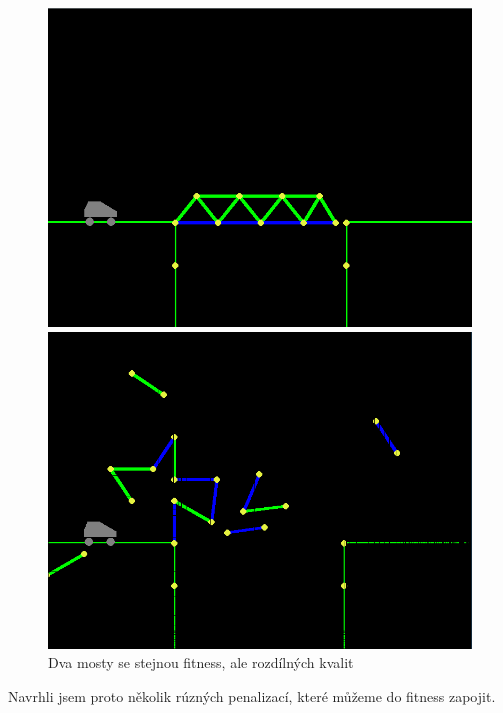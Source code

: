 \begin{figure}[ht]
    \centering
    \begin{minipage}{0.49\textwidth}
        \centering
        \includegraphics[width=\linewidth]{img/almost_good_bridge.png}
    \end{minipage}\hfill
    \begin{minipage}{0.49\textwidth}
        \centering
        \includegraphics[width=\linewidth]{img/bad_bridge.png}
    \end{minipage}
    \caption{Dva mosty se stejnou fitness, ale rozdílných kvalit}
    \label{fig:5}
\end{figure}

Navrhli jsem proto několik rúzných penalizací, které můžeme do fitness zapojit.

